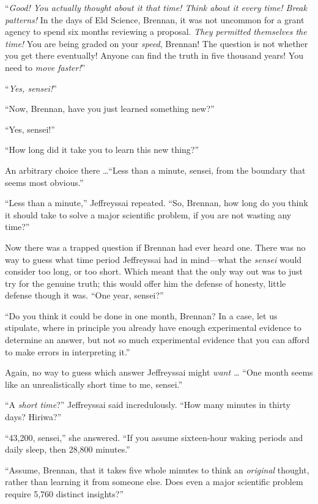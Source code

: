 {
 ``\textit{Good! You actually thought about it
that time! Think about it every time! Break patterns!} In the days of
Eld Science, Brennan, it was not uncommon for a grant agency to spend
six months reviewing a proposal. \textit{They permitted themselves the
time!} You are being graded on your \textit{speed}, Brennan! The
question is not whether you get there eventually! Anyone can find the
truth in five thousand years! You need to \textit{move
faster!}''}

{
 ``\textit{Yes, sensei!}''}

{
 ``Now, Brennan, have you just learned something
new?''}

{
 ``Yes, sensei!''}

{
 ``How long did it take you to learn this new
thing?''}

{
 An arbitrary choice there \ldots ``Less than a
minute, sensei, from the boundary that seems most
obvious.''}

{
 ``Less than a minute,''
Jeffreyssai repeated. ``So, Brennan, how long do you
think it should take to solve a major scientific problem, if you are
not wasting any time?''}

{
 Now there was a trapped question if Brennan had ever heard one.
There was no way to guess what time period Jeffreyssai had in
mind---what the \textit{sensei} would consider too long, or too short.
Which meant that the only way out was to just try for the genuine
truth; this would offer him the defense of honesty, little defense
though it was. ``One year,
sensei?''}

{
 ``Do you think it could be done in one month,
Brennan? In a case, let us stipulate, where in principle you already
have enough experimental evidence to determine an answer, but not so
much experimental evidence that you can afford to make errors in
interpreting it.''}

{
 Again, no way to guess which answer Jeffreyssai might \textit{want
\ldots} ``One month seems like an unrealistically short
time to me, sensei.''}

{
 ``A \textit{short time}?''
Jeffreyssai said incredulously. ``How many minutes in
thirty days? Hiriwa?''}

{
 ``43,200, sensei,'' she
answered. ``If you assume sixteen-hour waking periods
and daily sleep, then 28,800 minutes.''}

{
 ``Assume, Brennan, that it takes five whole
minutes to think an \textit{original} thought, rather than learning it
from someone else. Does even a major scientific problem require 5,760
distinct insights?''}

